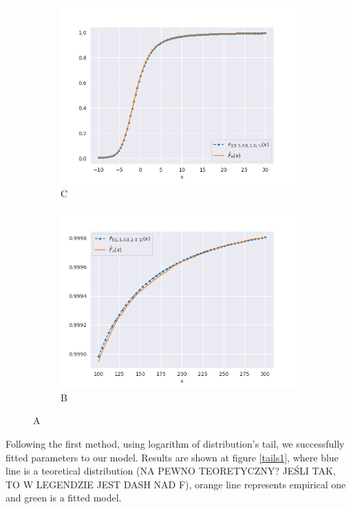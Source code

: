 \documentclass{article}
\begin{document}
		\begin{figure}[H]	
			\begin{subfigure}[h]{.5\textwidth}
				\centering
				\includegraphics[width=1\linewidth]{images/stable_CDF.png}
				\caption{C}
			\end{subfigure}
			\begin{subfigure}[r]{.5\textwidth}
				\centering
				\includegraphics[width=1\linewidth]{images/stable_CDF_large_x.png}
				\caption{B}
			\end{subfigure}
			\caption{A}\label{stable_cdf}
		\end{figure}

		Following the first method, using logarithm of distribution's tail, we successfully fitted parameters to our model. Results are shown at figure \ref{tails1}, where blue line is a teoretical distribution (NA PEWNO TEORETYCZNY? JEŚLI TAK, TO W LEGENDZIE JEST DASH NAD F), orange line represents empirical one and green is a fitted model.
		
\end{document}

